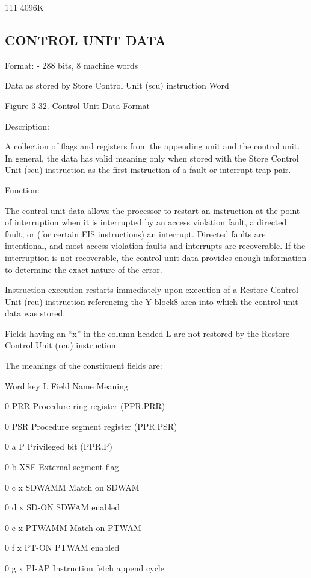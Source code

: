 111 4096K

\subsection{CONTROL UNIT DATA}

Format: - 288 bits, 8 machine words

Data as stored by Store Control Unit (scu) instruction Word

Figure 3-32. Control Unit Data Format

Description:

A collection of flags and registers from the appending unit and the control
unit. In general, the data has valid meaning only when stored with the Store
Control Unit (scu) instruction as the first instruction of a fault or interrupt
trap pair.

Function:

The control unit data allows the processor to restart an instruction at the
point of interruption when it is interrupted by an access violation fault, a
directed fault, or (for certain EIS instructions) an interrupt. Directed faults
are intentional, and most access violation faults and interrupts are
recoverable. If the interruption is not recoverable, the control unit data
provides enough information to determine the exact nature of the error.

Instruction execution restarts immediately upon execution of a Restore Control
Unit (rcu) instruction referencing the Y-block8 area into which the control
unit data was stored.

Fields having an {``}x'' in the column headed L are not restored by the Restore
Control Unit (rcu) instruction.

The meanings of the constituent fields are:

Word key L Field Name Meaning

0 PRR Procedure ring register (PPR.PRR)

0 PSR Procedure segment register (PPR.PSR)

0 a P Privileged bit (PPR.P)

0 b XSF External segment flag

0 c x SDWAMM Match on SDWAM

0 d x SD-ON SDWAM enabled

0 e x PTWAMM Match on PTWAM

0 f x PT-ON PTWAM enabled

0 g x PI-AP Instruction fetch append cycle

